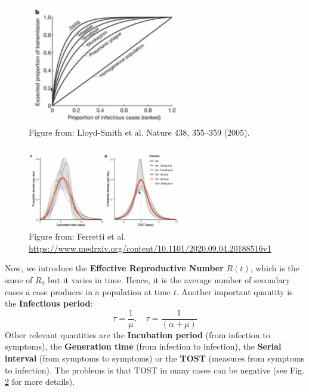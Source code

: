 \documentclass[../main/main.tex]{subfiles}
\begin{document}
\begin{figure}[h!]
\centering
\includegraphics[width=0.6\textwidth]{../lessons/image/02/3_outbreaks.png}
\caption{\label{fig:3_outbreaks} Figure from: Lloyd-Smith et al. Nature 438, 355–359 (2005).}
\end{figure}

\begin{figure}[h!]
\centering
\includegraphics[width=0.6\textwidth]{../lessons/image/02/4_TOST.png}
\caption{\label{fig:4_TOST} Figure from: Ferretti et al. \url{https://www.medrxiv.org/content/10.1101/2020.09.04.20188516v1}}
\end{figure}

Now, we introduce the \textbf{Effective Reproductive Number} \( R(t) \), which is the same of \( R_0 \) but it varies in time. Hence, it is the average number of secondary cases a case produces in a population at time \( t \).
Another important quantity is the \textbf{Infectious period}:
\begin{equation}
  \tau = \frac{1}{\mu }, \quad \tau = \frac{1}{(\alpha + \mu )}
\end{equation}
Other relevant quantities are the \textbf{Incubation period} (from infection to symptoms), the \textbf{Generation time} (from infection to infection), the \textbf{Serial interval} (from symptoms to symptoms) or the \textbf{TOST} (measures from symptoms to infection). The problems is that TOST in many cases can be negative (see Fig. \ref{fig:4_TOST} for more details).
\end{document}
